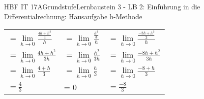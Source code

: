 \documentclass[oneside,openany,headings=optiontotoc,11pt,numbers=noenddot]{scrreprt}
\begin{document}
\begin{worksheet}{HBF IT 17A}{Grundstufe}{Lernbaustein 3 - LB 2: Einführung in die Differentialrechnung: Hausaufgabe h-Methode}
\begin{framed}
\begin{tabularx}{\textwidth}{X|X|X}
				\(=\lim\limits_{h \to 0}\frac{\frac{4h+h^2}{3}}{h}\) & \(=\lim\limits_{h \to 0}\frac{\frac{h^2}{3}}{h}\) & \(=\lim\limits_{h \to 0}\frac{\frac{-8h+h^2}{3}}{h}\)\\
				\(=\lim\limits_{h \to 0}\frac{4h+h^2}{3h}\) & \(=\lim\limits_{h \to 0}\frac{h^2}{3h}\) & \(=\lim\limits_{h \to 0}\frac{-8h+h^2}{3h}\)\\
				\(=\lim\limits_{h \to 0}\frac{4+h}{3}\) & \(=\lim\limits_{h \to 0}\frac{h}{3}\) & \(=\lim\limits_{h \to 0}\frac{-8+h}{3}\)\\
				\(=\frac{4}{3}\) & = 0 &\(= \frac{-8}{3}\)
			\end{tabularx}
		\end{framed}
	\end{worksheet}
\end{document}
